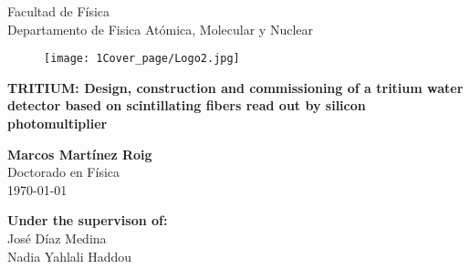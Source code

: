 \begin{titlepage}

\begin{center}


{\large Facultad de Física}\\
{\large Departamento de Fisica Atómica, Molecular y Nuclear}\\
\vspace*{0.2in}
\vspace*{0.6in}
\end{center}
\vspace*{-1in}
\begin{center}
\vspace*{1 cm}


\begin{figure}[htb]
\begin{center}
\texttt{[image: 1Cover\_page/Logo2.jpg]} 
\end{center}
\end{figure}
\vspace*{1 cm}

\begin{large}

\end{large}
\begin{Large}
\textbf{\LARGE TRITIUM: Design, construction and commissioning of a tritium water detector based on scintillating fibers read out by silicon photomultiplier} \\
\end{Large}
\vspace*{1.2 cm}

\begin{large}
\textbf{Marcos Martínez Roig}\\
Doctorado en Física\\
\today
\end{large}
\end{center}

\vspace*{-1.2 cm}
\begin{large}
\begin{flushright}
\item[\bf Under the supervison of:]\quad  \\ 
José Díaz Medina\\
Nadia Yahlali Haddou\\
\end{flushright}
\end{large}

\end{titlepage}
